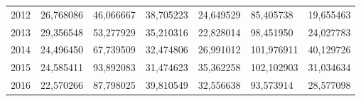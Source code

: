 \begin{table}
\begin{tabular}{p{1cm}p{2cm}p{2cm}p{2cm}p{2cm}p{2cm}p{2cm}}
 2012 &       26,768086 &        46,066667 &  38,705223 &                             24,649529 &                      85,405738 &         19,655463 \\
 2013 &       29,356548 &        53,277929 &  35,210316 &                             22,828014 &                      98,451950 &         24,027783 \\
 2014 &       24,496450 &        67,739509 &  32,474806 &                             26,991012 &                     101,976911 &         40,129726 \\
 2015 &       24,585411 &        93,892083 &  31,474623 &                             35,362258 &                     102,102903 &         31,034634 \\
 2016 &       22,570266 &        87,798025 &  39,810549 &                             32,556638 &                      93,573914 &         28,577098 \\
\bottomrule
\end{tabular}
\end{table}
